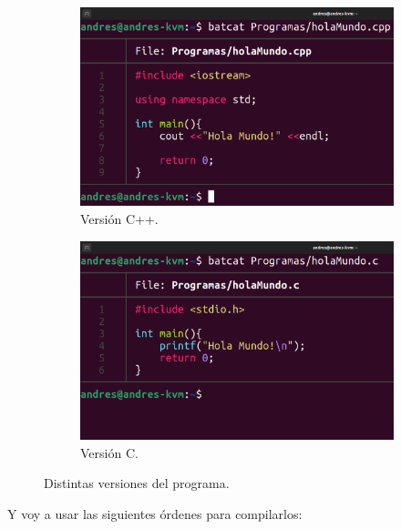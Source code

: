 \documentclass{article}
\begin{document}
\begin{figure}[H]
    \centering
    \begin{subfigure}{0.49\textwidth}
        \centering
        \includegraphics[width=\textwidth]{imagenes/Captura desde 2022-11-15 16-06-21.png}
        \caption{Versión C++.}
    \end{subfigure}
    \hfill
    \begin{subfigure}{0.49\textwidth}
        \centering
        \includegraphics[width=\textwidth]{imagenes/Captura desde 2022-11-15 16-06-14.png}
        \caption{Versión C.}
    \end{subfigure}

    \caption{Distintas versiones del programa.}
\end{figure}



Y voy a usar las siguientes órdenes para compilarlos:

\bigskip
\end{document}
